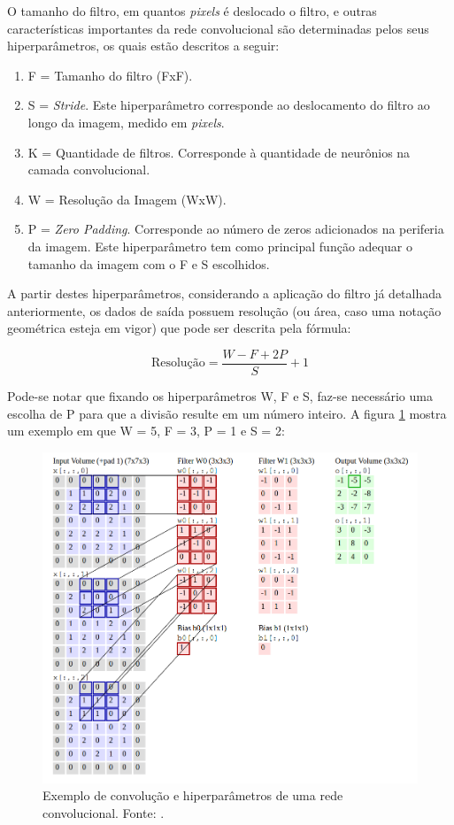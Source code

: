 \documentclass[
	12pt,				%
	oneside,			%
	a4paper,			%
	english,			%
	french,				%
	spanish,			%
	brazil,				%
	]{abntex2}
\begin{document}
O tamanho do filtro, em quantos \textit{pixels} é deslocado o filtro, e outras características importantes da rede convolucional são determinadas pelos seus hiperparâmetros, os quais estão descritos a seguir:
\begin{enumerate}
	\item F = Tamanho do filtro (FxF).
	\item S = \textit{Stride}. Este hiperparâmetro corresponde ao deslocamento do filtro ao longo da imagem, medido em \textit{pixels}.
	\item K = Quantidade de filtros. Corresponde à quantidade de neurônios na camada convolucional.
	\item W = Resolução da Imagem (WxW).
	\item P = \textit{Zero Padding}. Corresponde ao número de zeros adicionados na periferia da imagem. Este hiperparâmetro tem como principal função adequar o tamanho da imagem com o F e S escolhidos.
\end{enumerate}

A partir destes hiperparâmetros, considerando a aplicação do filtro já detalhada anteriormente, os dados de saída possuem resolução (ou área, caso uma notação geométrica esteja em vigor) que pode ser descrita pela fórmula:

\begin{equation}
	\textrm{Resolução} = \frac{W - F + 2P}{S} + 1 
	\label{resolução}
\end{equation}

Pode-se notar que fixando os hiperparâmetros W, F e S, faz-se necessário uma escolha de P para que a divisão resulte em um número inteiro. A figura \ref{exemplo_conv} mostra um exemplo em que W = 5, F = 3, P = 1 e S = 2:

\begin{figure}[H]
	\centering
	\includegraphics[width=.8\textwidth]{imagens/gif_conv}
	\caption{Exemplo de convolução e hiperparâmetros de uma rede convolucional. Fonte: \cite{ref3}.}
	\label{exemplo_conv}
\end{figure} 
\end{document}

